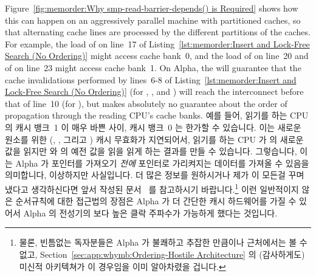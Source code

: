 Figure~\ref{fig:memorder:Why smp-read-barrier-depends() is Required}
shows how this can happen on
an aggressively parallel machine with partitioned caches, so that
alternating cache lines are processed by the different partitions
of the caches.
For example, the load of  on line~17 of
Listing~\ref{lst:memorder:Insert and Lock-Free Search (No Ordering)}
might access cache bank~0,
and the load of  on line~20 and of  on line~23
might access cache bank~1.
On Alpha, the  will guarantee that the cache invalidations
performed by lines~6-8 of
Listing~\ref{lst:memorder:Insert and Lock-Free Search (No Ordering)}
(for , , and ) will reach
the interconnect before that of line~10 (for ), but
makes absolutely no guarantee about the order of
propagation through the reading CPU's cache banks.
\fi
예를 들어, 읽기를 하는 CPU 의 캐시 뱅크~1 이 매우 바쁜 사이, 캐시 뱅크~0 는
한가할 수 있습니다.
이는 새로운 원소를 위한 (, , 그리고 ) 캐시
무효화가 지연되어서, 읽기를 하는 CPU 가  의 새로운 값을 읽지만
 와  의 예전 값을 읽을 읽게 하는 결과를 만들 수
있습니다.
그렇습니다, 이는 Alpha 가 포인터를 가져오기 {\em 전에} 포인터로 가리켜지는
데이터를 가져올 수 있음을 의미합니다, 이상하지만 사실입니다.
더 많은 정보를 원하시거나 제가 이 모든걸 꾸며냈다고 생각하신다면 앞서 작성된
문서~\cite{Compaq01,WilliamPugh2000Gharachorloo} 를 참고하시기
바랍니다.\footnote{
	물론, 빈틈없는 독자분들은 Alpha 가 불쾌하고 추잡한 만큼이나 근처에서는
	볼 수 없고, Section~\ref{sec:app:whymb:Ordering-Hostile Architecture}
	의 (감사하게도) 미신적 아키텍쳐가 이 경우임을 이미 알아차렸을 겁니다.}
이런 일반적이지 않은 순서규칙에 대한 접근법의 장점은 Alpha 가 더 간단한 캐시
하드웨어를 가질 수 있어서 Alpha 의 전성기의 보다 높은 클락 주파수가 가능하게
했다는 것입니다.


